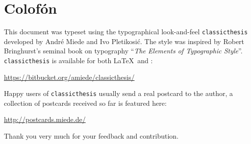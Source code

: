 \pagestyle{empty}

\hfill

\vfill


\section*{Colofón}
This document was typeset using the typographical look-and-feel \texttt{classicthesis} developed by Andr\'e Miede and Ivo Pletikosić.
The style was inspired by Robert Bringhurst's seminal book on typography ``\emph{The Elements of Typographic Style}''.
\texttt{classicthesis} is available for both \LaTeX\ and \mLyX:
\begin{center}
\url{https://bitbucket.org/amiede/classicthesis/}
\end{center}
Happy users of \texttt{classicthesis} usually send a real postcard to the author, a collection of postcards received so far is featured here:
\begin{center}
\url{http://postcards.miede.de/}
\end{center}
Thank you very much for your feedback and contribution.

\bigskip

\noindent\finalVersionString 
